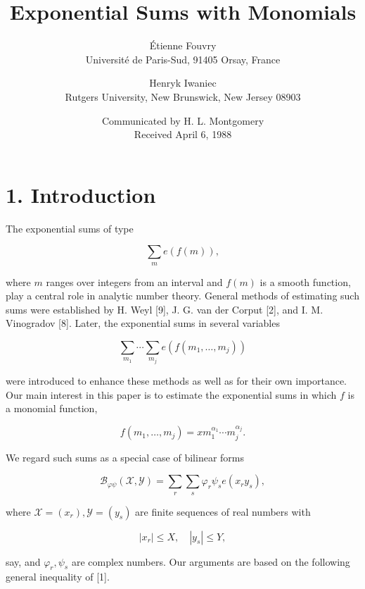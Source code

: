 \documentclass[10pt]{article}
\title{Exponential Sums with Monomials}
\author{Étienne Fouvry\\
Université de Paris-Sud, 91405 Orsay, France
\and
Henryk Iwaniec\\
Rutgers University, New Brunswick, New Jersey 08903}
\date{Communicated by H. L. Montgomery\\Received April 6, 1988}
\begin{document}
\maketitle

\section*{1. Introduction}
The exponential sums of type


\begin{equation*}
\sum_{m} e(f(m)), \tag{1.1}
\end{equation*}


where $m$ ranges over integers from an interval and $f(m)$ is a smooth function, play a central role in analytic number theory. General methods of estimating such sums were established by H. Weyl [9], J. G. van der Corput [2], and I. M. Vinogradov [8]. Later, the exponential sums in several variables


\begin{equation*}
\sum_{m_{1}} \cdots \sum_{m_{j}} e\left(f\left(m_{1}, \ldots, m_{j}\right)\right) \tag{1.2}
\end{equation*}


were introduced to enhance these methods as well as for their own importance. Our main interest in this paper is to estimate the exponential sums in which $f$ is a monomial function,


\begin{equation*}
f\left(m_{1}, \ldots, m_{j}\right)=x m_{1}^{\alpha_{1}} \cdots m_{j}^{\alpha_{j}} . \tag{1.3}
\end{equation*}


We regard such sums as a special case of bilinear forms


\begin{equation*}
\mathscr{B}_{\varphi \psi}(\mathscr{X}, \mathscr{Y})=\sum_{r} \sum_{s} \varphi_{r} \psi_{s} e\left(x_{r} y_{s}\right), \tag{1.4}
\end{equation*}


where $\mathscr{X}=\left(x_{r}\right), \mathscr{Y}=\left(y_{s}\right)$ are finite sequences of real numbers with


\begin{equation*}
\left|x_{r}\right| \leqslant X, \quad\left|y_{s}\right| \leqslant Y, \tag{1.5}
\end{equation*}


say, and $\varphi_{r}, \psi_{s}$ are complex numbers. Our arguments are based on the following general inequality of [1].
\end{document}
